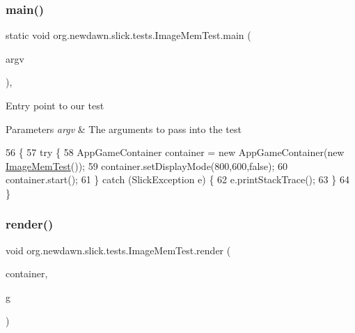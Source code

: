 \subsubsection{\texorpdfstring{main()}{main()}}
{\footnotesize\ttfamily static void org.\+newdawn.\+slick.\+tests.\+Image\+Mem\+Test.\+main (\begin{DoxyParamCaption}\item[{String \mbox{[}$\,$\mbox{]}}]{argv }\end{DoxyParamCaption})\hspace{0.3cm}{\ttfamily [inline]}, {\ttfamily [static]}}

Entry point to our test


\begin{DoxyParams}{Parameters}
{\em argv} & The arguments to pass into the test \\
\hline
\end{DoxyParams}

\begin{DoxyCode}
56                                            \{
57         \textcolor{keywordflow}{try} \{
58             AppGameContainer container = \textcolor{keyword}{new} AppGameContainer(\textcolor{keyword}{new} \mbox{\hyperlink{classorg_1_1newdawn_1_1slick_1_1tests_1_1_image_mem_test_a8fd5f0fae6b302ef04b1f1af1176dbb1}{ImageMemTest}}());
59             container.setDisplayMode(800,600,\textcolor{keyword}{false});
60             container.start();
61         \} \textcolor{keywordflow}{catch} (SlickException e) \{
62             e.printStackTrace();
63         \}
64     \}
\end{DoxyCode}
\mbox{\label{classorg_1_1newdawn_1_1slick_1_1tests_1_1_image_mem_test_a9ad05ee3e18b0cf40911c877d3ac673e}} 
\subsubsection{\texorpdfstring{render()}{render()}}
{\footnotesize\ttfamily void org.\+newdawn.\+slick.\+tests.\+Image\+Mem\+Test.\+render (\begin{DoxyParamCaption}\item[{\mbox{\hyperlink{classorg_1_1newdawn_1_1slick_1_1_game_container}{Game\+Container}}}]{container,  }\item[{\mbox{\hyperlink{classorg_1_1newdawn_1_1slick_1_1_graphics}{Graphics}}}]{g }\end{DoxyParamCaption})\hspace{0.3cm}{\ttfamily [inline]}}

